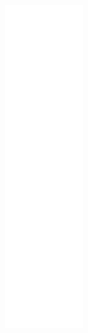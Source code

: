 \begin{figure}[H]
\begin{center}
\leavevmode
\includegraphics[height=400pt]{classExitStateHandler__coll__graph}
\end{center}
\end{figure}
